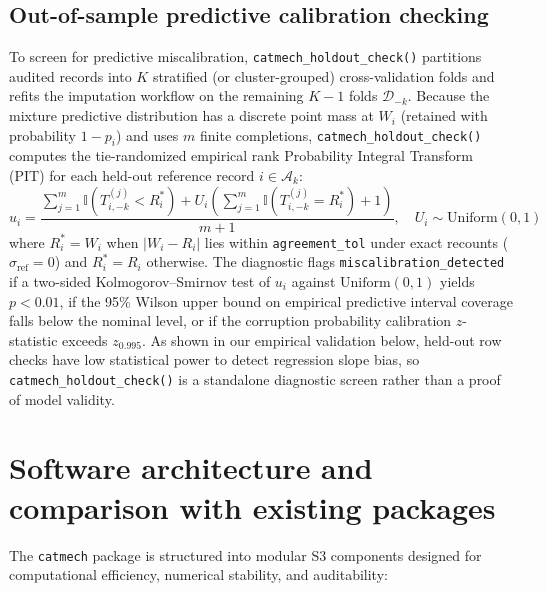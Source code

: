 \documentclass[
]{article}
\begin{document}
\subsection{Out-of-sample predictive calibration
checking}\label{out-of-sample-predictive-calibration-checking}

To screen for predictive miscalibration,
\texttt{catmech\_holdout\_check()} partitions audited records into \(K\)
stratified (or cluster-grouped) cross-validation folds and refits the
imputation workflow on the remaining \(K - 1\) folds
\(\mathcal{D}_{-k}\). Because the mixture predictive distribution has a
discrete point mass at \(W_i\) (retained with probability \(1 - p_i\))
and uses \(m\) finite completions, \texttt{catmech\_holdout\_check()}
computes the tie-randomized empirical rank Probability Integral
Transform (PIT) \citep{dawid1984present} for each held-out reference
record \(i \in \mathcal{A}_k\):
\[u_i = \frac{\sum_{j=1}^m \mathbb{I}(T_{i,-k}^{(j)} < R_i^*) + U_i \left(\sum_{j=1}^m \mathbb{I}(T_{i,-k}^{(j)} = R_i^*) + 1\right)}{m + 1}, \quad U_i \sim \text{Uniform}(0, 1)\]
where \(R_i^* = W_i\) when \(|W_i - R_i|\) lies within
\texttt{agreement\_tol} under exact recounts
(\(\sigma_{\text{ref}} = 0\)) and \(R_i^* = R_i\) otherwise. The
diagnostic flags \texttt{miscalibration\_detected} if a two-sided
Kolmogorov--Smirnov test of \(u_i\) against \(\text{Uniform}(0, 1)\)
yields \(p < 0.01\), if the 95\% Wilson upper bound on empirical
predictive interval coverage falls below the nominal level, or if the
corruption probability calibration \(z\)-statistic exceeds
\(z_{0.995}\). As shown in our empirical validation below, held-out row
checks have low statistical power to detect regression slope bias, so
\texttt{catmech\_holdout\_check()} is a standalone diagnostic screen
rather than a proof of model validity.

\section{Software architecture and comparison with existing
packages}\label{software-architecture-and-comparison-with-existing-packages}

The \texttt{catmech} package is structured into modular S3 components
designed for computational efficiency, numerical stability, and
auditability:
\end{document}

